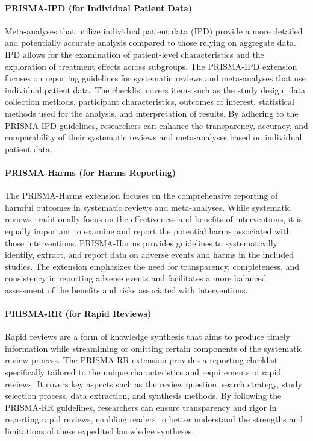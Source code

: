 \documentclass{article}
\begin{document}
\paragraph*{PRISMA-IPD (for Individual Patient Data)}
Meta-analyses that utilize individual patient data (IPD) provide a more detailed and potentially accurate analysis compared to those relying on aggregate data. IPD allows for the examination of patient-level characteristics and the exploration of treatment effects across subgroups. The PRISMA-IPD \cite{stewart2015preferred} extension focuses on reporting guidelines for systematic reviews and meta-analyses that use individual patient data. The checklist covers items such as the study design, data collection methods, participant characteristics, outcomes of interest, statistical methods used for the analysis, and interpretation of results. By adhering to the PRISMA-IPD guidelines, researchers can enhance the transparency, accuracy, and comparability of their systematic reviews and meta-analyses based on individual patient data.



\paragraph*{PRISMA-Harms (for Harms Reporting)}
The PRISMA-Harms \cite{zorzela2016prisma} extension focuses on the comprehensive reporting of harmful outcomes in systematic reviews and meta-analyses. While systematic reviews traditionally focus on the effectiveness and benefits of interventions, it is equally important to examine and report the potential harms associated with those interventions. PRISMA-Harms provides guidelines to systematically identify, extract, and report data on adverse events and harms in the included studies. The extension emphasizes the need for transparency, completeness, and consistency in reporting adverse events and facilitates a more balanced assessment of the benefits and risks associated with interventions.

\paragraph*{PRISMA-RR (for Rapid Reviews)}

Rapid reviews are a form of knowledge synthesis that aims to produce timely information while streamlining or omitting certain components of the systematic review process. The PRISMA-RR \cite{stevens2018developing} extension provides a reporting checklist specifically tailored to the unique characteristics and requirements of rapid reviews. It covers key aspects such as the review question, search strategy, study selection process, data extraction, and synthesis methods. By following the PRISMA-RR guidelines, researchers can ensure transparency and rigor in reporting rapid reviews, enabling readers to better understand the strengths and limitations of these expedited knowledge syntheses.
\end{document}
